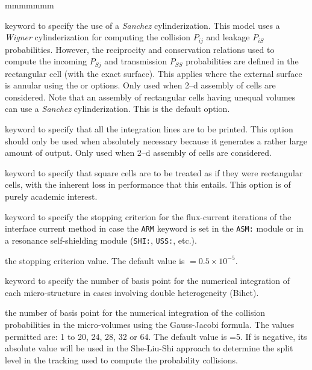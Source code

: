 \begin{ListeDeDescription}{mmmmmmm}
\item[\moc{SANC}] keyword to specify the use of a {\sl Sanchez} cylinderization.
This model uses a {\sl Wigner} cylinderization for computing the collision $P_{ij}$
and leakage $P_{iS}$ probabilities. However, the reciprocity and conservation
relations used to compute the incoming $P_{Sj}$ and transmission $P_{SS}$
probabilities are defined in the rectangular cell (with the exact
surface).\cite{SANCHEZ} 
This applies where the external surface is annular using the  or
 options. Only used when 2--d assembly of cells are considered. Note
that an assembly of rectangular cells having unequal volumes can use a
{\sl Sanchez} cylinderization. This is the default option.

\item[\moc{LIGN}] keyword to specify that all the integration lines are to be
printed. This option should only be used when absolutely necessary because it
generates a rather large amount of output. Only used when 2--d assembly of cells
are considered.

\item[\moc{RECT}] keyword to specify that square cells are to be treated as if
they were rectangular cells, with the inherent loss in performance that this
entails. This option is of purely academic interest.

\item[\moc{EPSJ}] keyword to specify the stopping criterion for the flux-current iterations of the
interface current method in case the {\tt ARM} keyword is set in the {\tt ASM:} module or in
a resonance self-shielding module ({\tt SHI:}, {\tt USS:}, etc.).

\item[\dusa{epsj}] the stopping criterion value. The default value is  $= 0.5 \times 10^{-5}$.

\item[\moc{QUAB}] keyword to specify the number of basis point for the
numerical integration of each micro-structure in cases involving double
heterogeneity (Bihet).

\item[\dusa{iquab}] the number of basis point for the numerical integration of
the collision probabilities in the micro-volumes using the  Gauss-Jacobi
formula. The values permitted are: 1 to 20, 24, 28, 32 or  64. The default value
is =5. If  is negative, its absolute value will be used in the She-Liu-Shi approach to determine the
split level in the tracking used to compute the probability collisions.


\end{ListeDeDescription}
